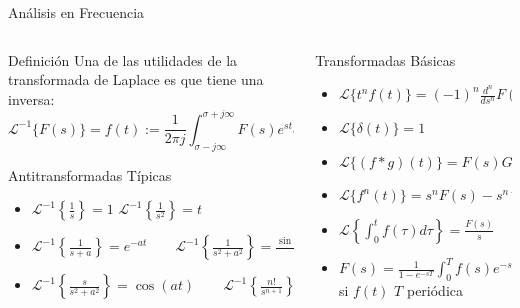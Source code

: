 \documentclass[
    10pt,
    aspectratio=169,
    xcolor={dvipsnames},
    spanish,
    ]{beamer}
\begin{document}
\begin{frame}{Análisis en Frecuencia}
\begin{columns}
  \begin{column}{0.55\textwidth}
    \begin{block}{Definición}
      \footnotesize
      Una de las utilidades de la transformada de Laplace es que tiene una inversa:
      $$\mathcal{L}^{-1}\{F(s)\} = f(t) := \frac{1}{2\pi j} \int_{\sigma-j\infty}^{\sigma+j\infty} F(s)e^{st}ds$$
    \end{block}
    
    \begin{block}{Antitransformadas Típicas}
      \footnotesize
      \begin{itemize}
        \item $\mathcal{L}^{-1}\left\{\frac{1}{s}\right\} = 1$ \qquad $\mathcal{L}^{-1}\left\{\frac{1}{s^2}\right\} = t$
        \item $\mathcal{L}^{-1}\left\{\frac{1}{s+a}\right\} = e^{-at} \qquad \mathcal{L}^{-1}\left\{\frac{1}{s^2+a^2}\right\} = \frac{\sin(at)}{a}$
        \item $\mathcal{L}^{-1}\left\{\frac{s}{s^2+a^2}\right\} = \cos(at) \qquad \mathcal{L}^{-1}\left\{\frac{n!}{s^{n+1}}\right\} = t^n$
      \end{itemize}
    \end{block}
  \end{column}
  
  \begin{column}{0.4\textwidth}
    \begin{block}{Transformadas Básicas}
      \footnotesize
      \begin{itemize}
        \item $\mathcal{L}\{t^n f(t)\} = (-1)^n \frac{d^n}{ds^n} F(s)$
        \item $\mathcal{L}\{\delta(t)\} = 1$
        \item $\mathcal{L}\{(f * g)(t)\} = F(s)G(s)$
        \item $\mathcal{L}\{f^n(t)\} = s^n F(s) - s^{n-1}F(0) - s^{n-2}F'(0) - \cdots$
        \item $\mathcal{L}\left\{\int_0^t f(\tau)d\tau\right\} = \frac{F(s)}{s}$
        \item $F(s) = \frac{1}{1-e^{-sT}} \int_0^T f(s)e^{-st}dt$ si $f(t)$ $T$ periódica
      \end{itemize}
    \end{block}
  \end{column}
\end{columns}
\end{frame}
\end{document}
